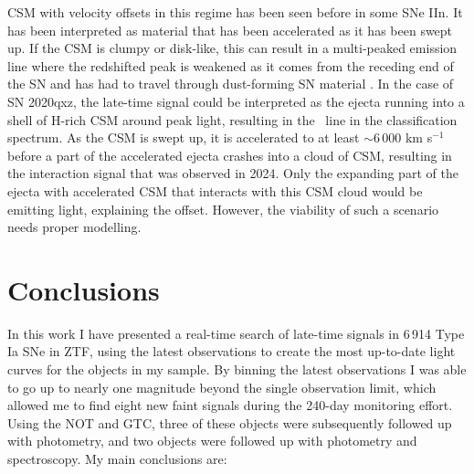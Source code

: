 \documentclass[a4paper,oneside,12pt, class=Latex/Classes/PhDthesisPSnPDF, crop=false]{standalone}
\begin{document}
CSM with velocity offsets in this regime has been seen before in some SNe IIn. It has been interpreted as material that has been accelerated as it has been swept up. If the CSM is clumpy or disk-like, this can result in a multi-peaked emission line where the redshifted peak is weakened as it comes from the receding end of the SN and has had to travel through dust-forming SN material \citep{1998S_aspherical_CSM, 1998S_late-time, PTF11iqb}. In the case of SN 2020qxz, the late-time signal could be interpreted as the ejecta running into a shell of H-rich CSM around peak light, resulting in the \Halpha\ line in the classification spectrum. As the CSM is swept up, it is accelerated to at least $\sim6\,000$ km s$^{-1}$ before a part of the accelerated ejecta crashes into a cloud of CSM, resulting in the interaction signal that was observed in 2024. Only the expanding part of the ejecta with accelerated CSM that interacts with this CSM cloud would be emitting light, explaining the offset. However, the viability of such a scenario needs proper modelling.


\section{Conclusions}
\label{conclusion}
In this work I have presented a real-time search of late-time signals in 6\,914 Type Ia SNe in ZTF, using the latest observations to create the most up-to-date light curves for the objects in my sample. By binning the latest observations I was able to go up to nearly one magnitude beyond the single observation limit, which allowed me to find eight new faint signals during the 240-day monitoring effort. Using the NOT and GTC, three of these objects were subsequently followed up with photometry, and two objects were followed up with photometry and spectroscopy. My main conclusions are:
\end{document}
